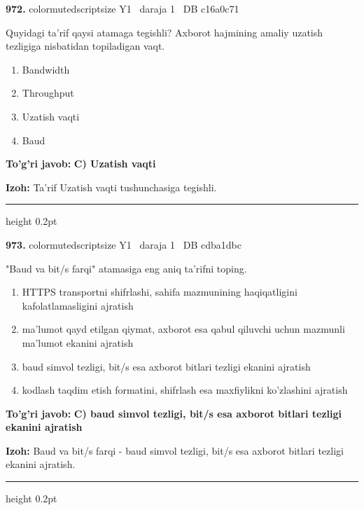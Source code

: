 \documentclass[10pt,a4paper,oneside]{article}
\begin{document}
\noindent\textbf{\color{ink}972.}  {color{muted}scriptsize Y1 \textbullet\ daraja 1 \textbullet\ DB c16a0c71}
\par
Quyidagi ta'rif qaysi atamaga tegishli? Axborot hajmining amaliy uzatish tezligiga nisbatidan topiladigan vaqt.
\begin{enumerate}[label=\Alph*),leftmargin=9mm]
\item Bandwidth
\item Throughput
\item Uzatish vaqti
\item Baud
\end{enumerate}
\begin{tcolorbox}[enhanced,breakable,colback=teal!4,colframe=teal!50!black,boxrule=0.5pt,arc=1.1mm,left=3mm,right=3mm,top=1.7mm,bottom=1.7mm,before skip=2mm,after skip=2mm]
\textbf{\color{teal}To'g'ri javob:} \textbf{C) Uzatish vaqti}
\par\smallskip
\textbf{Izoh:} Ta'rif Uzatish vaqti tushunchasiga tegishli.
\end{tcolorbox}
\vspace{2mm}\hrule height 0.2pt \vspace{3mm}

\noindent\textbf{\color{ink}973.}  {color{muted}scriptsize Y1 \textbullet\ daraja 1 \textbullet\ DB cdba1dbc}
\par
"Baud va bit/s farqi" atamasiga eng aniq ta'rifni toping.
\begin{enumerate}[label=\Alph*),leftmargin=9mm]
\item HTTPS transportni shifrlashi, sahifa mazmunining haqiqatligini kafolatlamasligini ajratish
\item ma'lumot qayd etilgan qiymat, axborot esa qabul qiluvchi uchun mazmunli ma'lumot ekanini ajratish
\item baud simvol tezligi, bit/s esa axborot bitlari tezligi ekanini ajratish
\item kodlash taqdim etish formatini, shifrlash esa maxfiylikni ko'zlashini ajratish
\end{enumerate}
\begin{tcolorbox}[enhanced,breakable,colback=teal!4,colframe=teal!50!black,boxrule=0.5pt,arc=1.1mm,left=3mm,right=3mm,top=1.7mm,bottom=1.7mm,before skip=2mm,after skip=2mm]
\textbf{\color{teal}To'g'ri javob:} \textbf{C) baud simvol tezligi, bit/s esa axborot bitlari tezligi ekanini ajratish}
\par\smallskip
\textbf{Izoh:} Baud va bit/s farqi - baud simvol tezligi, bit/s esa axborot bitlari tezligi ekanini ajratish.
\end{tcolorbox}
\vspace{2mm}\hrule height 0.2pt \vspace{3mm}
\end{document}
